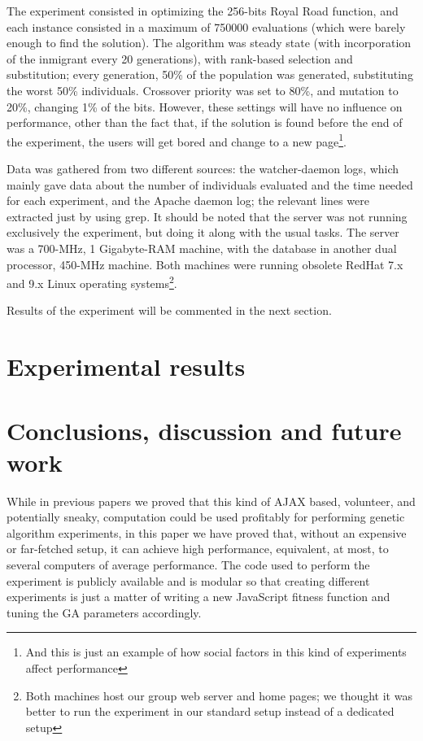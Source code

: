 \documentclass{llncs}
\begin{document}
The experiment consisted in optimizing the  256-bits Royal Road
function, and each instance consisted in a maximum of 750000
evaluations (which were barely enough to find the solution). The
algorithm was steady state (with incorporation of the inmigrant every 20
generations), with rank-based selection and substitution; every
generation, 50\% of the population was generated, substituting the
worst 50\% individuals. Crossover priority was set to 80\%, and
mutation  to 20\%, changing 1\% of the bits. However, these settings
will have no influence on performance, other than the fact that, if
the solution is found before the end of the experiment, the users will
get bored and change to a new page\footnote{And this is just an example of how
social factors in this kind of experiments affect performance}.

Data was gathered from two different sources: the watcher-daemon logs,
which mainly gave data about the number of individuals evaluated and
the time needed for each experiment, and the Apache daemon log; the
relevant lines were extracted just by using {\sf grep}. It should be
noted that the server was not running exclusively the experiment, but
doing it along with the usual tasks. The server was a 700-MHz, 1
Gigabyte-RAM machine, with the database in another dual processor,
450-MHz machine. Both machines were running obsolete RedHat 7.x and
9.x Linux operating systems\footnote{Both machines host our group web
  server and home pages; we thought it was better to run the
  experiment in our standard setup instead of a dedicated
  setup}. 

Results of the experiment will be commented in the next section.

\section{Experimental results}
\label{sec:exp}


\section{Conclusions, discussion and future work}
\label{sec:conc}

While in previous papers  we proved that
this kind of AJAX based, volunteer, and potentially sneaky,
computation could be used profitably for performing genetic algorithm
experiments, in this paper we have proved that, 
without an expensive or far-fetched setup, it can achieve high
performance, equivalent, at most, to several computers of average
performance. The code used to perform the experiment is publicly
available and is modular so that creating different experiments is
just a matter of writing a new JavaScript fitness function and tuning
the GA parameters accordingly. 
\end{document}
